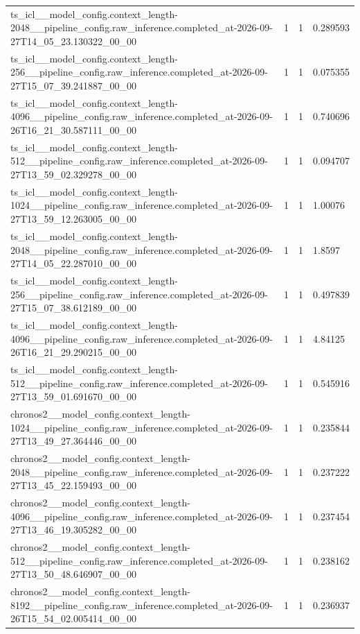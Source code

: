 \begin{tabular}{llll}
ts\_icl\_\_model\_config.context\_length-2048\_\_pipeline\_config.raw\_inference.completed\_at-2026-09-27T14\_05\_23.130322\_00\_00 & 1 & 1 & 0.289593 \\
ts\_icl\_\_model\_config.context\_length-256\_\_pipeline\_config.raw\_inference.completed\_at-2026-09-27T15\_07\_39.241887\_00\_00 & 1 & 1 & 0.075355 \\
ts\_icl\_\_model\_config.context\_length-4096\_\_pipeline\_config.raw\_inference.completed\_at-2026-09-26T16\_21\_30.587111\_00\_00 & 1 & 1 & 0.740696 \\
ts\_icl\_\_model\_config.context\_length-512\_\_pipeline\_config.raw\_inference.completed\_at-2026-09-27T13\_59\_02.329278\_00\_00 & 1 & 1 & 0.094707 \\
ts\_icl\_\_model\_config.context\_length-1024\_\_pipeline\_config.raw\_inference.completed\_at-2026-09-27T13\_59\_12.263005\_00\_00 & 1 & 1 & 1.00076 \\
ts\_icl\_\_model\_config.context\_length-2048\_\_pipeline\_config.raw\_inference.completed\_at-2026-09-27T14\_05\_22.287010\_00\_00 & 1 & 1 & 1.8597 \\
ts\_icl\_\_model\_config.context\_length-256\_\_pipeline\_config.raw\_inference.completed\_at-2026-09-27T15\_07\_38.612189\_00\_00 & 1 & 1 & 0.497839 \\
ts\_icl\_\_model\_config.context\_length-4096\_\_pipeline\_config.raw\_inference.completed\_at-2026-09-26T16\_21\_29.290215\_00\_00 & 1 & 1 & 4.84125 \\
ts\_icl\_\_model\_config.context\_length-512\_\_pipeline\_config.raw\_inference.completed\_at-2026-09-27T13\_59\_01.691670\_00\_00 & 1 & 1 & 0.545916 \\
chronos2\_\_model\_config.context\_length-1024\_\_pipeline\_config.raw\_inference.completed\_at-2026-09-27T13\_49\_27.364446\_00\_00 & 1 & 1 & 0.235844 \\
chronos2\_\_model\_config.context\_length-2048\_\_pipeline\_config.raw\_inference.completed\_at-2026-09-27T13\_45\_22.159493\_00\_00 & 1 & 1 & 0.237222 \\
chronos2\_\_model\_config.context\_length-4096\_\_pipeline\_config.raw\_inference.completed\_at-2026-09-27T13\_46\_19.305282\_00\_00 & 1 & 1 & 0.237454 \\
chronos2\_\_model\_config.context\_length-512\_\_pipeline\_config.raw\_inference.completed\_at-2026-09-27T13\_50\_48.646907\_00\_00 & 1 & 1 & 0.238162 \\
chronos2\_\_model\_config.context\_length-8192\_\_pipeline\_config.raw\_inference.completed\_at-2026-09-26T15\_54\_02.005414\_00\_00 & 1 & 1 & 0.236937 \\

\end{tabular}
